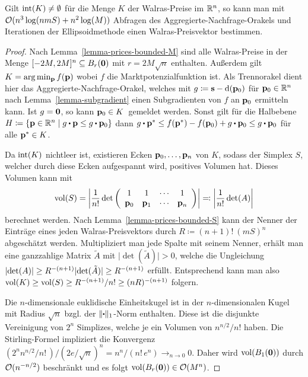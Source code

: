 \begin{theorem}\label{thm-compute-walras-with-ellipsoid}
	Gilt $\operatorname{int}(K) \neq \emptyset$ für die Menge $K$ der Walras-Preise im $\mathbb{R}^n$, so kann man mit $\mathcal{O}(n^3 \log(n m S) + n^2\log(M))$ Abfragen des Aggregierte-Nachfrage-Orakels und Iterationen der Ellipsoidmethode einen Walras-Preisvektor bestimmen.
\end{theorem}
\begin{proof}
	Nach Lemma~\ref{lemma-prices-bounded-M} sind alle Walras-Preise in der Menge $[-2M, 2M]^n\subseteq B_{r}(\mathbf{0})$ mit $r = 2M\sqrt{n}$ enthalten.
	Außerdem gilt $K = \arg\min_{\mathbf{p}} f(\mathbf{p})$ wobei $f$ die Marktpotenzialfunktion ist.
	Als Trennorakel dient hier das Aggregierte-Nachfrage-Orakel, welches mit $g \coloneqq \mathbf{s} - \operatorname{d}(\mathbf{p}_0)$ für $\mathbf{p}_0\in\mathbb{R}^n$ nach Lemma~\ref{lemma-subgradient} einen Subgradienten von $f$ an $\mathbf{p}_0$ ermitteln kann.
	Ist $g = \mathbf{0}$, so kann \glqq$\mathbf{p}_0 \in K$\grqq\ gemeldet werden.
	Sonst gilt für die Halbebene $H\coloneqq\{ \fp\in\R^n \mid g\bcdot \fp \leq g\bcdot \fp_0 \}$ dann $g\bcdot \fp^* \leq f(\fp^*) - f(\fp_0) + g \bcdot \fp_0 \leq g \bcdot \fp_0$ für alle $\mathbf{p}^*\in K$.
	
	Da $\operatorname{int}(K)$ nichtleer ist, existieren Ecken $\mathbf{p}_0, \dots, \mathbf{p}_n$ von $K$, sodass der Simplex $S$, welcher durch diese Ecken aufgespannt wird, positives Volumen hat.
	Dieses Volumen kann mit
	\[ \operatorname{vol}(S) = \left\lvert  \frac{1}{n!} \det\left(  \begin{array}{ccccc}
		1 & 1 & \cdots & 1 \\	
		\mathbf{p}_0 & \mathbf{p}_1 & \cdots & \mathbf{p}_n
	\end{array}  \right) \right\rvert  \eqqcolon \left\lvert  \frac{1}{n!} \det(A)  \right\rvert \]
	berechnet werden.
	Nach Lemma~\ref{lemma-prices-bounded-S} kann der Nenner der Einträge eines jeden Walras-Preisvektors durch $R \coloneqq (n+1)!\ (mS)^n$ abgeschätzt werden.
	Multipliziert man jede Spalte mit seinem Nenner,
	erhält man eine ganzzahlige Matrix $\tilde{A}$ mit $\lvert \det(\tilde{A}) \rvert > 0$,
	welche die Ungleichung $\left\lvert  \det(A)  \right\rvert \geq R^{-(n+1)} \lvert \det(\tilde{A}) \rvert \geq R^{-(n+1)}$ erfüllt.
	Entsprechend kann man also $\operatorname{vol}(K) \geq \operatorname{vol}(S) \geq R^{-(n+1)} / n! \geq (nR)^{-(n+1)}$ folgern.
	
	Die $n$-dimensionale euklidische Einheitskugel ist in der $n$-dimensionalen Kugel mit Radius $\sqrt{n}$ bzgl. der $\lVert \bcdot \rVert_1$-Norm enthalten.
	Diese ist die disjunkte Vereinigung von $2^n$ Simplizes, welche je ein Volumen von $n^{n/2}/n!$ haben.
	Die Stirling-Formel impliziert die Konvergenz $(2^n n^{n/2}/n!\,)/(2e/\sqrt{n})^{n} = n^n/(n!\, e^n) \rightarrow_{n\rightarrow 0}0$. Daher wird $\operatorname{vol}(B_1(\mathbf{0}))$ durch $\mathcal{O}(n^{-n/2})$ beschränkt und es folgt $\operatorname{vol}(B_r(\mathbf{0}))\in\mathcal{O}(M^n)$.	
	

\end{proof}
